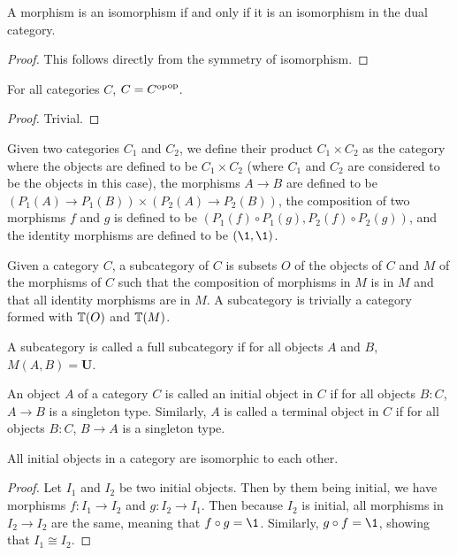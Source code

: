 \documentclass[../math.tex]{subfiles}
\begin{document}
\begin{theorem}
    A morphism is an isomorphism if and only if it is an isomorphism in the dual
    category.
\end{theorem}
\begin{proof}
    This follows directly from the symmetry of isomorphism.
\end{proof}

\begin{theorem}
    For all categories $C$, $C = {C^{\mathrm{op}}}^{\mathrm{op}}$.
\end{theorem}
\begin{proof}
    Trivial.
\end{proof}

\begin{definition}
    Given two categories $C_1$ and $C_2$, we define their product $C_1 \times
    C_2$ as the category where the objects are defined to be $C_1 \times C_2$
    (where $C_1$ and $C_2$ are considered to be the objects in this case), the
    morphisms $A \to B$ are defined to be $(P_1(A) \to P_1(B)) \times (P_2(A)
    \to P_2(B))$, the composition of two morphisms $f$ and $g$ is defined to be
    $(P_1(f) \circ P_1(g), P_2(f) \circ P_2(g))$, and the identity morphisms are
    defined to be $(\1, \1)$.
\end{definition}

\begin{definition}
    Given a category $C$, a subcategory of $C$ is subsets $O$ of the objects of
    $C$ and $M$ of the morphisms of $C$ such that the composition of morphisms
    in $M$ is in $M$ and that all identity morphisms are in $M$.  A subcategory
    is trivially a category formed with $\mathbb{T}(O)$ and $\mathbb{T}(M)$.
\end{definition}

\begin{definition}
    A subcategory is called a full subcategory if for all objects $A$ and $B$,
    $M(A, B) = \mathbf U$.
\end{definition}

\begin{definition}
    An object $A$ of a category $C$ is called an initial object in $C$ if for
    all objects $B : C$, $A \to B$ is a singleton type.  Similarly, $A$ is
    called a terminal object in $C$ if for all objects $B : C$, $B \to A$ is a
    singleton type.
\end{definition}

\begin{theorem}
    All initial objects in a category are isomorphic to each other.
\end{theorem}
\begin{proof}
    Let $I_1$ and $I_2$ be two initial objects.  Then by them being initial, we
    have morphisms $f : I_1 \to I_2$ and $g : I_2 \to I_1$.  Then because $I_2$
    is initial, all morphisms in $I_2 \to I_2$ are the same, meaning that $f
    \circ g = \1$.  Similarly, $g \circ f = \1$, showing that $I_1 \cong I_2$.
\end{proof}
\end{document}
